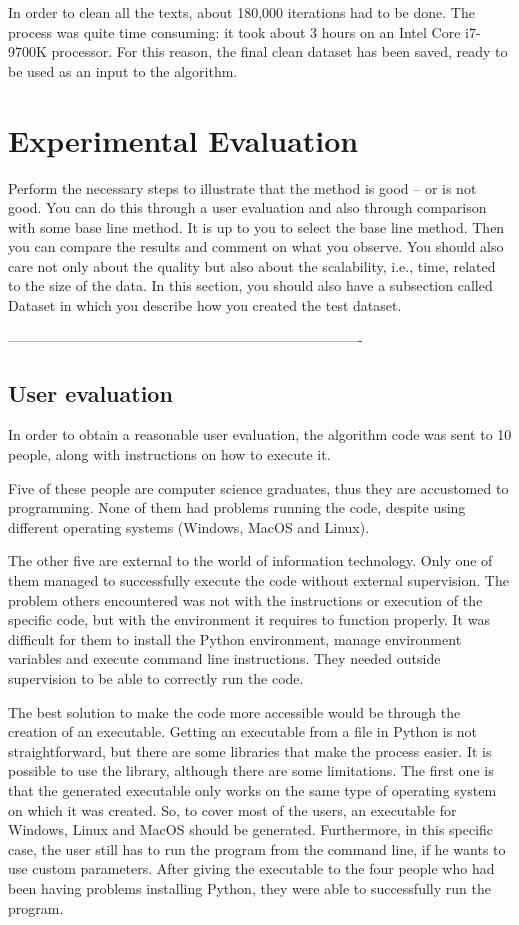 In order to clean all the texts, about 180,000 iterations had to be done. The process was quite time consuming: it took about 3 hours on an Intel Core i7-9700K processor. For this reason, the final clean dataset has been saved, ready to be used as an input to the algorithm.


\section{Experimental Evaluation}
 
Perform the necessary steps to illustrate that the method is good – or is not good. You can do this through a user evaluation and also through comparison with some base line method. It is up to you to select the base line method. Then you can compare the results and comment on what you observe. You should also care not only about the quality but also about the scalability, i.e., time, related to the size of the data. In this section, you should also have a subsection called Dataset in which you describe how you created the test dataset.

----------------------------------------------------------------------------

\subsection*{User evaluation}
In order to obtain a reasonable user evaluation, the algorithm code was sent to 10 people, along with instructions on how to execute it.

Five of these people are computer science graduates, thus they are accustomed to programming. None of them had problems running the code, despite using different operating systems (Windows, MacOS and Linux).

The other five are external to the world of information technology. Only one of them managed to successfully execute the code without external supervision. The problem others encountered was not with the instructions or execution of the specific code, but with the environment it requires to function properly. It was difficult for them to install the Python environment, manage environment variables and execute command line instructions. They needed outside supervision to be able to correctly run the code.

The best solution to make the code more accessible would be through the creation of an executable. Getting an executable from a  file in Python is not straightforward, but there are some libraries that make the process easier. It is possible to use the  library, although there are some limitations. The first one is that the generated executable only works on the same type of operating system on which it was created. So, to cover most of the users, an executable for Windows, Linux and MacOS should be generated. Furthermore, in this specific case, the user still has to run the program from the command line, if he wants to use custom parameters. After giving the executable to the four people who had been having problems installing Python, they were able to successfully run the program.

